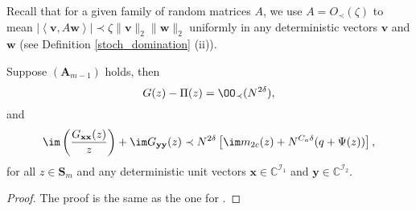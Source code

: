 Recall that for a given family of random matrices $A$, we use $A=O_\prec(\zeta)$ to mean $\left|\left\langle\mathbf v, A\mathbf w\right\rangle\right|\prec\zeta \| \mathbf v\|_2 \|\mathbf w\|_2 $ uniformly in any deterministic vectors $\mathbf v$ and $\mathbf w$ (see Definition \ref{stoch_domination} (ii)).

\begin{lemma}\label{lemm_comp_2}
Suppose $(\mathbf A_{m-1})$ holds, then
 \begin{equation}\label{eq_comp_apbound}
  G(z)-\Pi(z)=\OO_{\prec}(N^{2\delta}),
 \end{equation}
 and
\begin{equation}\label{eq_comp_apbound2}
\im \left(\frac{G_{\mathbf x\mathbf x}(z)}{z}\right) + \im G_{\mathbf y\mathbf y}(z) \prec N^{2\delta}\left[ \im m_{2c}(z)+N^{C_a\delta}(q+\Psi(z))\right],
\end{equation}
 for all $z \in \mathbf S_m$ and any deterministic unit vectors $\mathbf x \in \mathbb C^{\mathcal I_1}$ and $\mathbf y \in \mathbb C^{\mathcal I_2}$.
\end{lemma}
\begin{proof} The proof is the same as the one for \cite[Lemma 7.13]{Anisotropic}.\end{proof}

